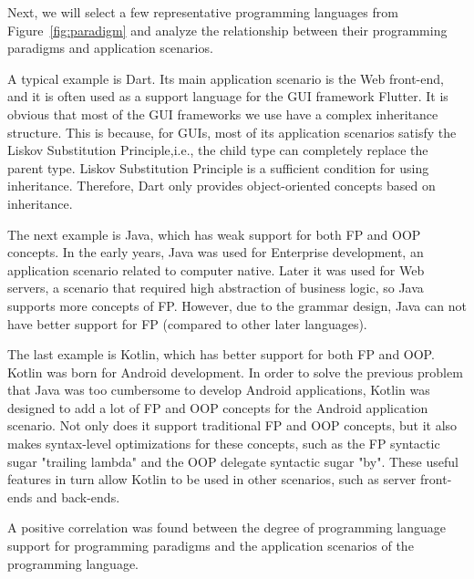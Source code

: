 Next, we will select a few representative programming languages from Figure~\ref{fig:paradigm} and analyze the
relationship between their programming paradigms and application scenarios.

A typical example is Dart.
Its main application scenario is the Web front-end,
and it is often used as a support language for the GUI framework Flutter.
It is obvious that most of the GUI frameworks we use have a complex inheritance structure.
This is because, for GUIs, most of its application scenarios satisfy the Liskov Substitution Principle,i.e.,
the child type can completely replace the parent type.
Liskov Substitution Principle is a sufficient condition for using inheritance.
Therefore, Dart only provides object-oriented concepts based on inheritance.

The next example is Java, which has weak support for both FP and OOP concepts.
In the early years, Java was used for Enterprise development, an application scenario related to computer native.
Later it was used for Web servers, a scenario that required high abstraction of business logic,
so Java supports more concepts of FP\@.
However, due to the grammar design, Java can not have better support for FP (compared to other later languages).

The last example is Kotlin, which has better support for both FP and OOP\@.
Kotlin was born for Android development.
In order to solve the previous problem that Java was too cumbersome to develop Android applications,
Kotlin was designed to add a lot of FP and OOP concepts for the Android application scenario.
Not only does it support traditional FP and OOP concepts, but it also makes syntax-level optimizations for
these concepts, such as the FP syntactic sugar "trailing lambda" and the OOP delegate syntactic sugar "by".
These useful features in turn allow Kotlin to be used in other scenarios, such as server front-ends and back-ends.

A positive correlation was found between the degree of programming language support for
programming paradigms and the application scenarios of the programming language.